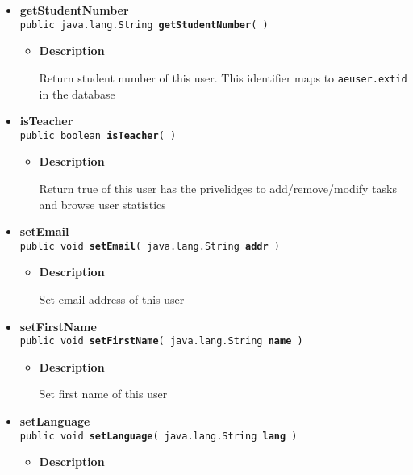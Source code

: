 {{{\begin{itemize}
{\begin{itemize}
{Return access level of this user - see static STATUS\_* constants
}
\end{itemize}
}%
 \item{ 
{\bf getStudentNumber}\\
{\tt public java.lang.String\ {\bf getStudentNumber}(  )
\label{fi.helsinki.cs.kohahdus.User.getStudentNumber()}}%
\begin{itemize}
\item{
{\bf Description}

Return student number of this user. This identifier maps to {\tt\small aeuser.extid} in the database
}
\end{itemize}
}%
 \item{ 
{\bf isTeacher}\\
{\tt public boolean\ {\bf isTeacher}(  )
\label{fi.helsinki.cs.kohahdus.User.isTeacher()}}%
\begin{itemize}
\item{
{\bf Description}

Return true of this user has the privelidges to add/remove/modify tasks and browse user statistics
}
\end{itemize}
}%
 \item{ 
{\bf setEmail}\\
{\tt public void\ {\bf setEmail}( {\tt java.lang.String} {\bf addr} )
\label{fi.helsinki.cs.kohahdus.User.setEmail(java.lang.String)}}%
\begin{itemize}
\item{
{\bf Description}

Set email address of this user
}
\end{itemize}
}%
 \item{ 
{\bf setFirstName}\\
{\tt public void\ {\bf setFirstName}( {\tt java.lang.String} {\bf name} )
\label{fi.helsinki.cs.kohahdus.User.setFirstName(java.lang.String)}}%
\begin{itemize}
\item{
{\bf Description}

Set first name of this user
}
\end{itemize}
}%
 \item{ 
{\bf setLanguage}\\
{\tt public void\ {\bf setLanguage}( {\tt java.lang.String} {\bf lang} )
\label{fi.helsinki.cs.kohahdus.User.setLanguage(java.lang.String)}}%
\begin{itemize}
\item{
{\bf Description}

}
\end{itemize}}
\end{itemize}}}}
